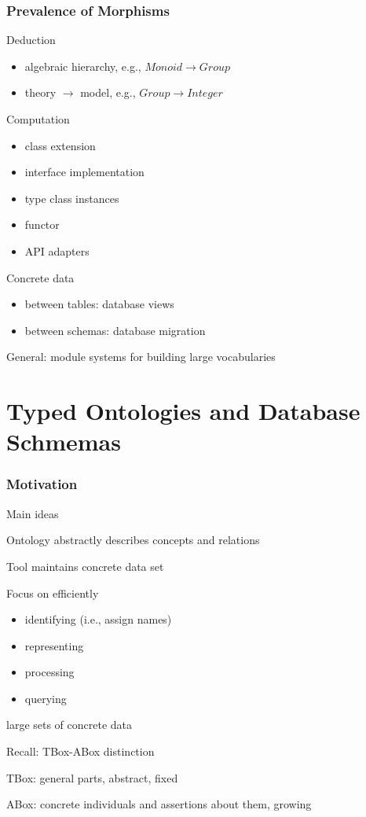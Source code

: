 \begin{frame}\frametitle{Prevalence of Morphisms}
Deduction
\begin{itemize}
\item algebraic hierarchy, e.g., $Monoid\to Group$
\item theory $\to$ model, e.g., $Group\to Integer$
\end{itemize}
Computation
\begin{itemize}
\item class extension
\item interface implementation
\item type class instances
\item functor
\item API adapters
\end{itemize}
Concrete data
\begin{itemize}
\item between tables: database views
\item between schemas: database migration
\end{itemize}

General: module systems for building large vocabularies
\end{frame}

\section{Typed Ontologies and Database Schmemas}

\begin{frame}\frametitle{Motivation}
\begin{blockitems}{Main ideas}
\item Ontology abstractly describes concepts and relations
\item Tool maintains concrete data set
\item Focus on efficiently
  \begin{itemize}
  \item identifying (i.e., assign names)
  \item representing
  \item processing
  \item querying
  \end{itemize}
  large sets of concrete data
\end{blockitems}

\begin{blockitems}{Recall: TBox-ABox distinction}
  \item TBox: general parts, abstract, fixed
  \item ABox: concrete individuals and assertions about them, growing
\end{blockitems}
\end{frame}

